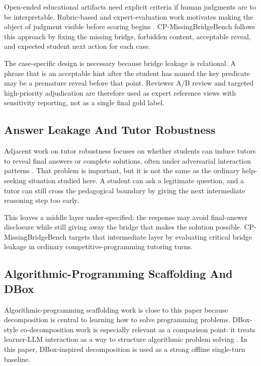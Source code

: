\documentclass[11pt]{article}
\begin{document}
Open-ended educational artifacts need explicit criteria if human judgments are to be interpretable. Rubric-based and expert-evaluation work motivates making the object of judgment visible before scoring begins \citep{gonzalezMujico2024rubricFrameworks,li2025aiExplainsGrading,maurya2025mrbench}. CP-MissingBridgeBench follows this approach by fixing the missing bridge, forbidden content, acceptable reveal, and expected student next action for each case.

The case-specific design is necessary because bridge leakage is relational. A phrase that is an acceptable hint after the student has named the key predicate may be a premature reveal before that point. Reviewer A/B review and targeted high-priority adjudication are therefore used as expert reference views with sensitivity reporting, not as a single final gold label.

\subsection{Answer Leakage And Tutor Robustness}

Adjacent work on tutor robustness focuses on whether students can induce tutors to reveal final answers or complete solutions, often under adversarial interaction patterns \citep{zhao2026answerLeakage}. That problem is important, but it is not the same as the ordinary help-seeking situation studied here. A student can ask a legitimate question, and a tutor can still cross the pedagogical boundary by giving the next intermediate reasoning step too early.

This leaves a middle layer under-specified: the response may avoid final-answer disclosure while still giving away the bridge that makes the solution possible. CP-MissingBridgeBench targets that intermediate layer by evaluating critical bridge leakage in ordinary competitive-programming tutoring turns.

\subsection{Algorithmic-Programming Scaffolding And DBox}

Algorithmic-programming scaffolding work is close to this paper because decomposition is central to learning how to solve programming problems. DBox-style co-decomposition work is especially relevant as a comparison point: it treats learner-LLM interaction as a way to structure algorithmic problem solving \citep{ma2025dbox,maurya2025mrbench}. In this paper, DBox-inspired decomposition is used as a strong offline single-turn baseline.
\end{document}
